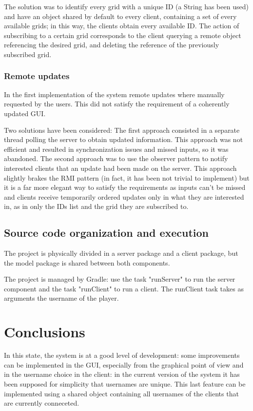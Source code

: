 \documentclass[12pt, a4paper]{report}
\begin{document}
The solution was to identify every grid with a unique ID (a String has been
 used) and have an object shared by default to every client, containing a set
 of every available grids; in this way, the clients obtain every available ID. The
 action of subscribing to a certain grid corresponds to the client querying a
 remote object referencing the desired grid, and deleting the reference of the
 previously subscribed grid.

\subsection{Remote updates}
In the first implementation of the system remote updates where manually
 requested by the users. This did not satisfy the requirement of a coherently
 updated GUI.

Two solutions have been considered:
The first approach consisted in a separate thread polling the server to obtain 
 updated information. This approach was not efficient and resulted in
 synchronization issues and missed inputs, so it was abandoned. The second
 approach was to use the observer pattern to notify interested clients that an
 update had been made on the server. This approach slightly brakes the RMI
 pattern (in fact, it has been not trivial to implement) but it is a far more
 elegant way to satisfy the requirements as inputs can't be missed and clients
 receive temporarily ordered updates only in what they are interested in, as in
 only the IDs list and the grid they are subscribed to.

\section{Source code organization and execution}
The project is physically divided in a server package and a client package, but
 the model package is shared between both components.

The project is managed by Gradle: use the task "runServer" to run the server
 component and the task "runClient" to run a client. The runClient task takes
 as arguments the username of the player.

\chapter{Conclusions}
In this state, the system is at a good level of development: some improvements
 can be implemented in the GUI, especially from the graphical point of view and
 in the username choice in the client: in the current version of the system it
 has been supposed for simplicity that usernames are unique. This last feature
 can be implemented using a shared object containing all usernames of the
 clients that are currently conneceted.
\end{document}
